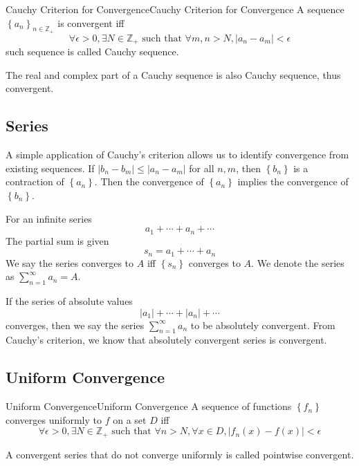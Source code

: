 \documentclass[../main.tex]{subfiles}
\begin{document}
\begin{theorem}{Cauchy Criterion for Convergence}{Cauchy Criterion for Convergence}
	A sequence $\left\{ a_n \right\}_{n\in \mathbb{Z}_+}$ is convergent iff
\begin{equation*}
	\forall \epsilon>0, \exists N\in \mathbb{Z}_+ \text{ such that } \forall m,n>N, \left|a_n-a_m\right|<\epsilon
\end{equation*}
such sequence is called Cauchy sequence.
\end{theorem}
The real and complex part of a Cauchy sequence is also Cauchy sequence, thus convergent.

\subsection{Series}
A simple application of Cauchy's criterion allows us to identify convergence from existing sequences. If $|b_n-b_m| \leq |a_n-a_m|$ for all $n,m$, then $\left\{ b_n \right\}$ is a contraction of $\left\{ a_n \right\}$. Then the convergence of $\left\{ a_n \right\}$ implies the convergence of $\left\{ b_n \right\}$.

For an infinite series
\begin{equation}
a_1 + \cdots + a_n + \cdots
\end{equation}
The partial sum is given
\begin{equation*}
s_n = a_1 + \cdots + a_n
\end{equation*}
We say the series converges to $A$ iff $\left\{ s_n \right\}$ converges to $A$. We denote the series as $\sum_{n=1}^{\infty } a_n = A$.

If the series of absolute values
\begin{equation}
\left|a_1\right| + \cdots + \left|a_n\right| + \cdots
\end{equation}
converges, then we say the series $\sum_{n=1}^{\infty } a_n$ to be absolutely convergent. From Cauchy's criterion, we know that absolutely convergent series is convergent.

\subsection{Uniform Convergence}
\begin{definition}{Uniform Convergence}{Uniform Convergence}
	A sequence of functions $\left\{ f_n \right\}$ converges uniformly to $f$ on a set $D$ iff
	\begin{equation*}
		\forall \epsilon>0, \exists N\in \mathbb{Z}_+ \text{ such that } \forall n>N, \forall x\in D, \left|f_n(x)-f(x)\right|<\epsilon
	\end{equation*}

	A convergent series that do not converge uniformly is called pointwise convergent.
\end{definition}
\end{document}
